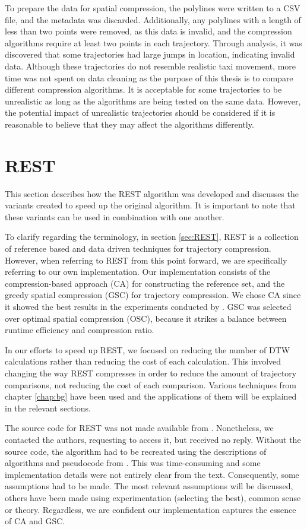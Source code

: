 To prepare the data for spatial compression, the polylines were written to a CSV file, and the metadata was discarded. Additionally, any polylines with a length of less than two points were removed, as this data is invalid, and the compression algorithms require at least two points in each trajectory. Through analysis, it was discovered that some trajectories had large jumps in location, indicating invalid data. Although these trajectories do not resemble realistic taxi movement, more time was not spent on data cleaning as the purpose of this thesis is to compare different compression algorithms. It is acceptable for some trajectories to be unrealistic as long as the algorithms are being tested on the same data. However, the potential impact of unrealistic trajectories should be considered if it is reasonable to believe that they may affect the algorithms differently.

\section{REST}
This section describes how the REST algorithm was developed and discusses the variants created to speed up the original algorithm. It is important to note that these variants can be used in combination with one another.

To clarify regarding the terminology, in section \ref{sec:REST}, REST is a collection of reference based and data driven techniques for trajectory compression. However, when referring to REST from this point forward, we are specifically referring to our own implementation. Our implementation consists of the compression-based approach (CA) for constructing the reference set, and the greedy spatial compression (GSC) for trajectory compression. We chose CA since it showed the best results in the experiments conducted by \textcite{zhao2018rest}. GSC was selected over optimal spatial compression (OSC), because it strikes a balance between runtime efficiency and compression ratio.

In our efforts to speed up REST, we focused on reducing the number of DTW calculations rather than reducing the cost of each calculation. This involved changing the way REST compresses in order to reduce the amount of trajectory comparisons, not reducing the cost of each comparison. Various techniques from chapter \ref{chap:bg} have been used and the applications of them will be explained in the relevant sections.

The source code for REST was not made available from \textcite{zhao2018rest}. Nonetheless, we contacted the authors, requesting to access it, but received no reply. Without the source code, the algorithm had to be recreated using the descriptions of algorithms and pseudocode from \textcite{zhao2018rest}. This was time-consuming and some implementation details were not entirely clear from the text. Consequently, some assumptions had to be made. The most relevant assumptions will be discussed, others have been made using experimentation (selecting the best), common sense or theory. Regardless, we are confident our implementation captures the essence of CA and GSC.

